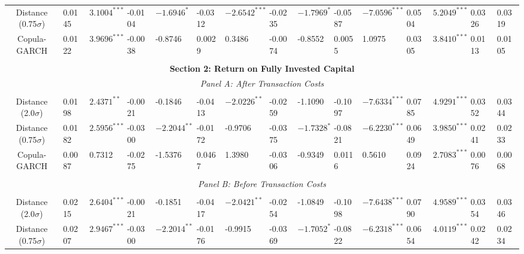 \documentclass[a4paper]{article}
\begin{document}
\begin{sidewaystable}
\begin{threeparttable}[H]
\begin{tabularx}{\textwidth}{@{\extracolsep{\fill}}lllllllllllllll@{}}
			\multicolumn{1}{c}{Distance (0.75$\sigma$)} & 0.0145 & $3.1004^{***}$ & -0.0104 & $-1.6946^{*}$ & -0.0312 & $-2.6542^{***}$ & -0.0235 & $-1.7969^{*}$ & -0.0587 & $-7.0596^{***}$ & 0.0504 & $5.2049^{***}$ & 0.0326 & 0.0319 \\
			\multicolumn{1}{c}{Copula-GARCH} & 0.0122 & $3.9696^{***}$ & -0.0038 & -0.8746 & 0.0029 & 0.3486 & -0.0074 & -0.8552 & 0.0055 & 1.0975 & 0.0305 & $3.8410^{***}$ & 0.0113 & 0.0105 \\
			&       &       &       &       &       &       &       &       &       &       &       &       &       &  \\
			\midrule
			\multicolumn{15}{c}{\textbf{Section 2: Return on Fully Invested Capital}} \\
			\multicolumn{15}{c}{\textit{Panel A: After Transaction Costs}} \\
			&       &       &       &       &       &       &       &       &       &       &       &       &       &  \\
			\multicolumn{1}{c}{Distance (2.0$\sigma$)} & 0.0198 & $2.4371^{**}$ & -0.0021 & -0.1846 & -0.0413 & $-2.0226^{**}$ & -0.0259 & -1.1090 & -0.1097 & $-7.6334^{***}$ & 0.0785 & $4.9291^{***}$ & 0.0352 & 0.0344 \\
			\multicolumn{1}{c}{Distance (0.75$\sigma$)} & 0.0182 & $2.5956^{***}$ & -0.0300 & $-2.2044^{**}$ & -0.0172 & -0.9706 & -0.0375 & $-1.7328^{*}$ & -0.0821 & $-6.2230^{***}$ & 0.0649 & $3.9850^{***}$ & 0.0241 & 0.0233 \\
			\multicolumn{1}{c}{Copula-GARCH} & 0.0087 & 0.7312 & -0.0275 & -1.5376 & 0.0467 & 1.3980 & -0.0306 & -0.9349 & 0.0116 & 0.5610 & 0.0924 & $2.7083^{***}$ & 0.0076 & 0.0068 \\
			&       &       &       &       &       &       &       &       &       &       &       &       &       &  \\
			\multicolumn{15}{c}{\textit{Panel B: Before Transaction Costs}} \\
			&       &       &       &       &       &       &       &       &       &       &       &       &       &  \\
			\multicolumn{1}{c}{Distance (2.0$\sigma$)} & 0.0215 & $2.6404^{***}$ & -0.0021 & -0.1851 & -0.0417 & $-2.0421^{**}$ & -0.0254 & -1.0849 & -0.1098 & $-7.6438^{***}$ & 0.0790 & $4.9589^{***}$ & 0.0354 & 0.0346 \\
			\multicolumn{1}{c}{Distance (0.75$\sigma$)} & 0.0207 & $2.9467^{***}$ & -0.0300 & $-2.2014^{**}$ & -0.0176 & -0.9915 & -0.0369 & $-1.7052^{*}$ & -0.0822 & $-6.2318^{***}$ & 0.0654 & $4.0119^{***}$ & 0.0242 & 0.0234 \\

\end{tabularx}
\end{threeparttable}
\end{sidewaystable}
\end{document}
